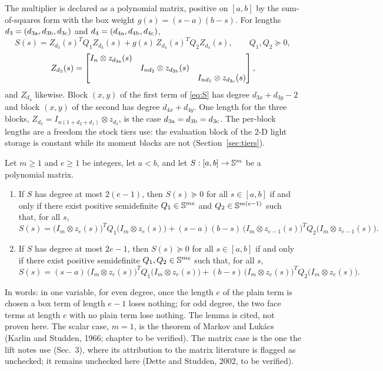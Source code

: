 The multiplier is declared as a polynomial matrix, positive on $[a,b]$ by the sum-of-squares form with the box weight $g(s)=(s-a)(b-s)$. For lengths $d_3=(d_{3\mathrm{a}},d_{3\mathrm{b}},d_{3\mathrm{c}})$ and $d_4=(d_{4\mathrm{a}},d_{4\mathrm{b}},d_{4\mathrm{c}})$,
\begin{equation}\label{eq:S}
S(s)=Z_{d_3}(s)^TQ_1Z_{d_3}(s)+g(s)\,Z_{d_4}(s)^TQ_2Z_{d_4}(s),\qquad Q_1,Q_2\succeq0,
\end{equation}
\begin{equation}\label{eq:Z3}
Z_{d_3}(s)=\begin{bmatrix} I_n\otimes z_{d_{3\mathrm{a}}}(s)&&\\&I_{nd_2}\otimes z_{d_{3\mathrm{b}}}(s)&\\&&I_{nd_1}\otimes z_{d_{3\mathrm{c}}}(s) \end{bmatrix},
\end{equation}
and $Z_{d_4}$ likewise. Block $(x,y)$ of the first term of \eqref{eq:S} has degree $d_{3x}+d_{3y}-2$ and block $(x,y)$ of the second has degree $d_{4x}+d_{4y}$. One length for the three blocks, $Z_{d_3}=I_{n(1+d_2+d_1)}\otimes z_{d_3}$, is the case $d_{3\mathrm{a}}=d_{3\mathrm{b}}=d_{3\mathrm{c}}$. The per-block lengths are a freedom the stock tiers use: the evaluation block of the 2-D light storage is constant while its moment blocks are not (Section~\ref{sec:tiers}).

\begin{lemma}\label{lem:ml}
Let $m\ge1$ and $e\ge1$ be integers, let $a<b$, and let $S:[a,b]\to\mathbb{S}^m$ be a polynomial matrix.
\begin{enumerate}\setlength\itemsep{0pt}
\item[(i)] If $S$ has degree at most $2(e-1)$, then $S(s)\succeq0$ for all $s\in[a,b]$ if and only if there exist positive semidefinite $Q_1\in\mathbb{S}^{me}$ and $Q_2\in\mathbb{S}^{m(e-1)}$ such that, for all $s$,
\[
S(s)=\bigl(I_m\otimes z_{e}(s)\bigr)^TQ_1\bigl(I_m\otimes z_{e}(s)\bigr)+(s-a)(b-s)\,\bigl(I_m\otimes z_{e-1}(s)\bigr)^TQ_2\bigl(I_m\otimes z_{e-1}(s)\bigr).
\]
\item[(ii)] If $S$ has degree at most $2e-1$, then $S(s)\succeq0$ for all $s\in[a,b]$ if and only if there exist positive semidefinite $Q_1,Q_2\in\mathbb{S}^{me}$ such that, for all $s$,
\[
S(s)=(s-a)\,\bigl(I_m\otimes z_{e}(s)\bigr)^TQ_1\bigl(I_m\otimes z_{e}(s)\bigr)+(b-s)\,\bigl(I_m\otimes z_{e}(s)\bigr)^TQ_2\bigl(I_m\otimes z_{e}(s)\bigr).
\]
\end{enumerate}
\end{lemma}
In words: in one variable, for even degree, once the length $e$ of the plain term is chosen a box term of length $e-1$ loses nothing; for odd degree, the two face terms at length $e$ with no plain term lose nothing. The lemma is cited, not proven here. The scalar case, $m=1$, is the theorem of Markov and Luk\'acs (Karlin and Studden, 1966; chapter to be verified). The matrix case is the one the lift notes use (Sec.~3), where its attribution to the matrix literature is flagged as unchecked; it remains unchecked here (Dette and Studden, 2002, to be verified).

